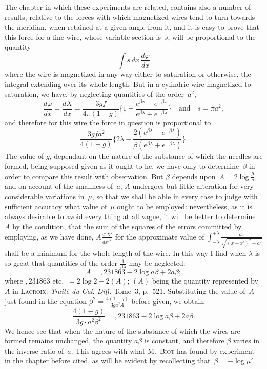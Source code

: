 \documentclass[12pt,notitlepage]{amsart}
\let\Person\textsc
\let\Title\textit
\renewcommand{\phi}{\varphi}
\begin{document}
The chapter in which these experiments are related, contains also a
number of results, relative to the forces with which magnetized wires tend
to turn towards the meridian, when retained at a given angle from it, and
it is easy to prove that this force for a fine wire,
whose variable section is~$s$,
will be proportional to the quantity
\[
\int s\,dx\,\frac{d\phi}{dx}
\]
where the wire is magnetized in any way either to saturation or otherwise,
the integral extending over its whole length. But in a cylindric wire 
magnetized to saturation, we have, by neglecting quantities of the order~$a^2$,
\[
\frac{d\phi}{dx}=\frac{dX}{dx}=
\frac{3gf}{4\pi(1-g)}\biggl\{1-
\frac{e^{\beta x}-e^{-\beta x}}{e^{\beta\lambda}+e^{-\beta\lambda}}\biggr\}
\quad\text{and}\quad
s=\pi a^2,
\]
and therefore for this wire the force in question is proportional to
\[
\frac{3gfa^2}{4(1-g)}\biggl\{2\lambda-
\frac{2(e^{\beta\lambda}-e^{-\beta\lambda})}
{\beta(e^{\beta\lambda}+e^{-\beta\lambda})}\biggr\}.
\]
The value of $g$, dependant on the nature of the substance of which
the needles are formed, being supposed given as it ought to he, we have only
to determine~$\beta$ in order to compare this result with observation.
But $\beta$
depends upon~$A=2\log\frac{\mu}{a}$,
and on account of the smallness of~$a$, $A$ undergoes
but little alteration for very considerable variations in~$\mu$, so that we
shall be able in every case to judge with sufficient accuracy what value 
of~$\mu$
ought to be employed: nevertheless, as it is always desirable to avoid every
thing at all vague, it will be better to determine~$A$ by the condition, that
the sum of the squares of the errors committed by employing, as we have
done, $A\frac{d^2X'}{dx'^2}$ for the approximate
value of $\int_{-\lambda}^{+\lambda}\frac{dx}{\sqrt{(x-x')^2+a^2}}$
shall be a minimum for the whole length of the wire.
In this way I find when $\lambda$ is so
great that quantities of the order $\frac{1}{\beta\lambda}$ may be neglected:
\[
A = ,231863-2\log a\beta+2a\beta;
\]
where $,231863$ etc.\ $= 2\log2-2(A)$; $(A)$ being the quantity represented
by~$A$ in \Person{Lacroix}: \Title{Trait\'e du Cal. Diff.}
Tome~3, p.~521. Substituting the value
of~$A$ just found in the equation $\beta^2=\frac{4(1-g)}{3ga^2A}$
before given, we obtain
\[
\frac{4(1-g)}{3g\cdot a^2\beta^2}=,231863-2\log a\beta+2a\beta.
\]
We hence see that when the nature of the substance of which the wires are
formed remains unchanged, the quantity $a\beta$ is constant,
and therefore $\beta$ varies
in the inverse ratio of~$a$. This agrees with
what M.~\Person{Biot} has found by experiment
in the chapter before cited, as will be evident by recollecting
that~$\beta=-\log\mu'$.
\end{document}
